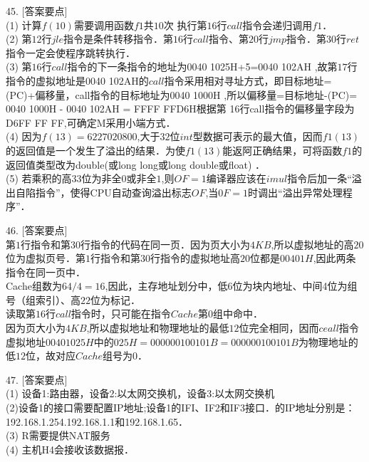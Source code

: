 45. [答案要点] \\
(1) 计算$f(10)$需要调用函数$f1$共$10$次 执行第$16$行$call$指令会递归调用$f1$． \\
(2) 第$12$行$jle$指令是条件转移指令．第$16$行$call$指令、第$20$行$jmp$指令．第$30$行$ret$指令一定会使程序跳转执行． \\
(3) 第$16$行$call$指令的下一条指令的地址为0040 1025H+5=0040 102AH ,故第$17$行指令的虚拟地址是0040 102AH的$call$指令采用相对寻址方式，即目标地址=(PC)+偏移量，call指令的目标地址为0040 1000H ,所以偏移量=目标地址-(PC)= 0040 1000H - 0040 102AH = FFFF FFD6H根据第 16行call指令的偏移量字段为D6FF FF FF,可确定M采用小端方式． \\
(4) 因为$f(13) = 6 227020 800$,大于$32$位$int$型数据可表示的最大值，因而$f1(13)$的返回值是一个发生了溢出的结果．为使$f1(13)$能返阿正确结果，可将函数$f1$的返回值类型改为double(或long long或long double或float) ． \\
(5) 若乘积的高$33$位为非全$0$或非全$1$,则$OF=1$编译器应该在$imul$指令后加一条“溢出自陷指令”，使得CPU自动查询溢出标志$OF$,当$0F=1$时调出“溢出异常处理程序”．

46. [答案要点] \\
第$1$行指令和第$30$行指令的代码在同一页．因为页大小为$4 KB$,所以虚拟地址的高$20$位为虚拟页号．第$1$行指令和第$30$行指令的虚拟地址高$20$位都是$00401H$,因此两条指令在同一页中． \\
Cache组数为$64/4=16$,因此，主存地址划分中，低$6$位为块内地址、中间4位为组号（组索引）、高$22$位为标记． \\
读取第$16$行$call$指令时，只可能在指令$Cache$第$0$组中命中． \\
因为页大小为$4KB$,所以虚拟地址和物理地址的最低$12$位完全相同，因而$ceall$指令虚拟地址$00401025H$中的$025H=000000100101B=000000100101B$为物理地址的低$12$位，故对应$Cache$组号为$0$．

47. [答案要点] \\
(1) 设备1:路由器，设备2:以太网交换机，设备3:以太网交换机 \\
(2)设备1的接口需要配置IP地址;设备1的IFI、IF2和IF3接口．的IP地址分别是：192.168.1.254.192.168.1.1和192.168.1.65． \\
(3) R需要提供NAT服务 \\
(4) 主机H4会接收该数据报．